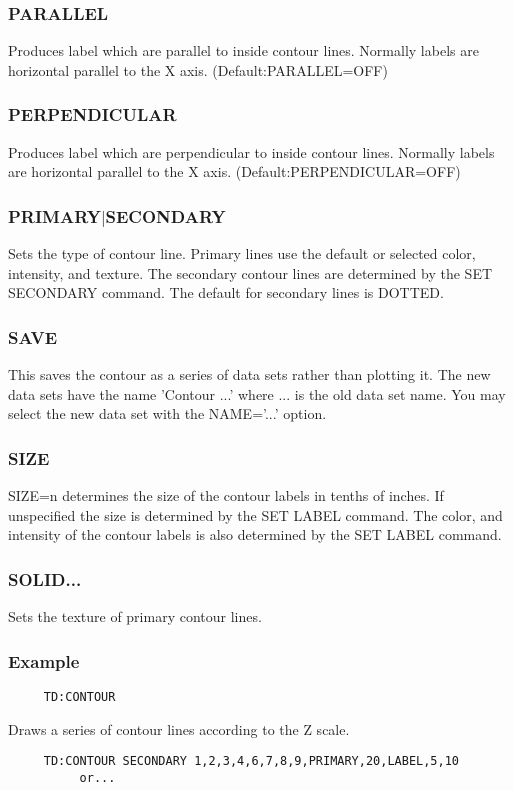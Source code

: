 \subsubsection{PARALLEL}
Produces  label  which  are parallel to inside contour lines.  Normally
labels are horizontal parallel to the X axis.  
(Default:PARALLEL=OFF) 
\subsubsection{PERPENDICULAR}
Produces  label  which  are  perpendicular  to  inside  contour  lines.
Normally labels are horizontal parallel to the X axis.  
(Default:PERPENDICULAR=OFF) 
\subsubsection{PRIMARY$|$SECONDARY}
Sets  the  type  of  contour  line.   Primary  lines use the default or
selected color, intensity, and texture.  The  secondary  contour  lines
are determined by the SET SECONDARY command.  The default for secondary
lines is DOTTED.  
\subsubsection{SAVE}
This  saves  the  contour as a series of data sets rather than plotting
it.  The new data sets have the name 'Contour ...' where  ...   is  the
old data set name.  You may select the new data set with the NAME='...'
option.  
\subsubsection{SIZE}
SIZE=n  determines  the size of the contour labels in tenths of inches.
If unspecified the size is determined by the  SET LABEL  command.   The
color,  and  intensity  of the contour labels is also determined by the
SET LABEL command.  
\subsubsection{SOLID...}
Sets the texture of primary contour lines.  
\subsubsection{Example}
\begin{verbatim}
     TD:CONTOUR 
\end{verbatim}
Draws a series of contour lines according to the Z scale.  

\begin{verbatim}
     TD:CONTOUR SECONDARY 1,2,3,4,6,7,8,9,PRIMARY,20,LABEL,5,10 
          or...  
\end{verbatim}

